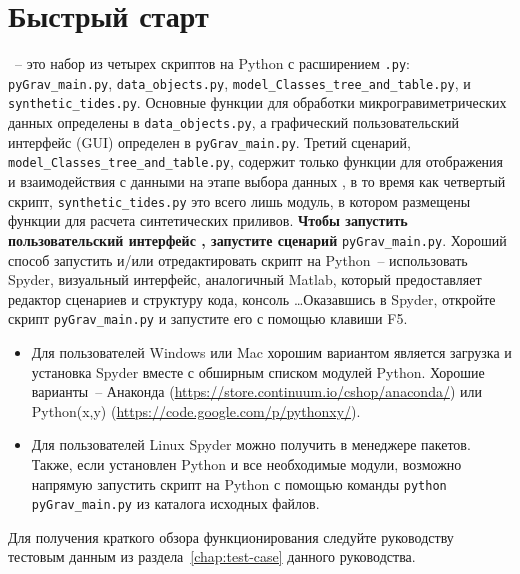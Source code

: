 \chapter[Быстрый старт]{Быстрый старт}
\label{chap:quick_start}

\pg{}~-- это набор из четырех скриптов на Python с расширением \verb|.py|:
\verb|pyGrav_main.py|, \verb|data_objects.py|, \verb|model_Classes_tree_and_table.py|, и
\verb|synthetic_tides.py|. Основные функции для обработки микрогравиметрических данных
определены в \verb|data_objects.py|, а графический пользовательский интерфейс (GUI)
определен в \verb|pyGrav_main.py|. Третий сценарий, \verb|model_Classes_tree_and_table.py|,
содержит только функции для отображения и взаимодействия с данными на этапе
выбора данных \pg{}, в то время как четвертый скрипт, \verb|synthetic_tides.py| это
всего лишь модуль, в котором размещены функции для расчета синтетических
приливов. \textbf{Чтобы запустить пользовательский интерфейс \pg{}, запустите сценарий}
\verb|pyGrav_main.py|. Хороший способ запустить и/или отредактировать скрипт
на Python~-- использовать Spyder, визуальный интерфейс, аналогичный Matlab,
который предоставляет редактор сценариев и структуру кода, консоль \dots Оказавшись в
Spyder, откройте скрипт \verb|pyGrav_main.py| и запустите его с помощью
клавиши F5.

\begin{itemize}
    \item Для пользователей Windows или Mac хорошим вариантом является загрузка
    и установка Spyder вместе с обширным списком модулей Python. Хорошие
    варианты~-- Анаконда (\url{https://store.continuum.io/cshop/anaconda/}) или
    Python(x,y) (\url{https://code.google.com/p/pythonxy/}).

    \item Для пользователей Linux Spyder можно получить в менеджере пакетов.
    Также, если установлен Python и все необходимые модули, возможно напрямую
    запустить скрипт на Python с помощью команды \verb|python pyGrav_main.py| из
    каталога исходных файлов.

\end{itemize}

Для получения краткого обзора функционирования \pg{} следуйте руководству
тестовым данным из раздела~\ref{chap:test-case} данного руководства.